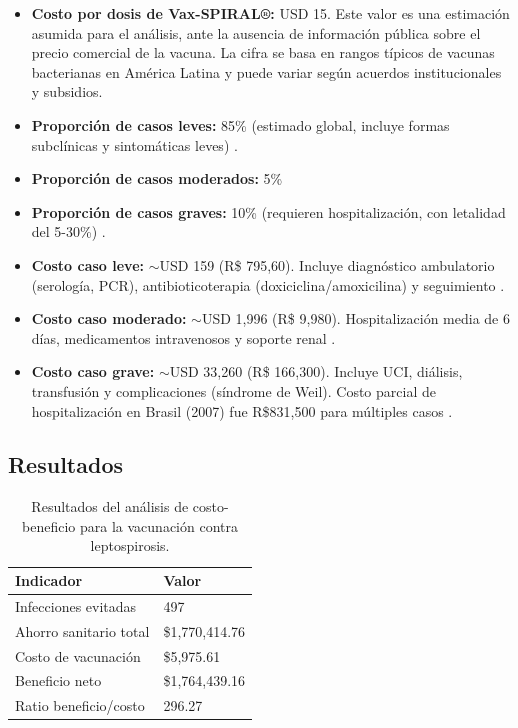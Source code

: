 \documentclass[12pt,a4paper]{article}
\begin{document}
\begin{itemize}
    \item \textbf{Costo por dosis de Vax-SPIRAL®:} USD 15. Este valor es una estimación asumida para el análisis, ante la ausencia de información pública sobre el precio comercial de la vacuna. La cifra se basa en rangos típicos de vacunas bacterianas en América Latina y puede variar según acuerdos institucionales y subsidios.

    \item \textbf{Proporción de casos leves:} 85\% (estimado global, incluye formas subclínicas y sintomáticas leves) \cite{who2022}.  

    \item \textbf{Proporción de casos moderados:} 5\%

    \item \textbf{Proporción de casos graves:} 10\% (requieren hospitalización, con letalidad del 5-30\%) \cite{who2022,msbrasil2021}.  

    \item \textbf{Costo caso leve:} $\sim$USD 159 (R\$ 795,60\footnotemark[1]). Incluye diagnóstico ambulatorio (serología, PCR), antibioticoterapia (doxiciclina/amoxicilina) y seguimiento \cite{who2022,souza2011}.  

    \item \textbf{Costo caso moderado:} $\sim$USD 1,996 (R\$ 9,980\footnotemark[1]). Hospitalización media de 6 días, medicamentos intravenosos y soporte renal \cite{souza2011}.  

    \item \textbf{Costo caso grave:} $\sim$USD 33,260 (R\$ 166,300\footnotemark[1]). Incluye UCI, diálisis, transfusión y complicaciones (síndrome de Weil). Costo parcial de hospitalización en Brasil (2007) fue R\$831,500 para múltiples casos \cite{souza2011}.  
\end{itemize}





\subsection{Resultados}
\begin{table}[H]
\centering
\begin{tabular}{@{}ll@{}}
\toprule
\textbf{Indicador} & \textbf{Valor} \\
\midrule
Infecciones evitadas & 497 \\
Ahorro sanitario total & \$1,770,414.76 \\
Costo de vacunación & \$5,975.61 \\
Beneficio neto & \$1,764,439.16 \\
Ratio beneficio/costo & 296.27 \\
\bottomrule
\end{tabular}
\caption{Resultados del análisis de costo-beneficio para la vacunación contra leptospirosis.}
\end{table}
\end{document}
